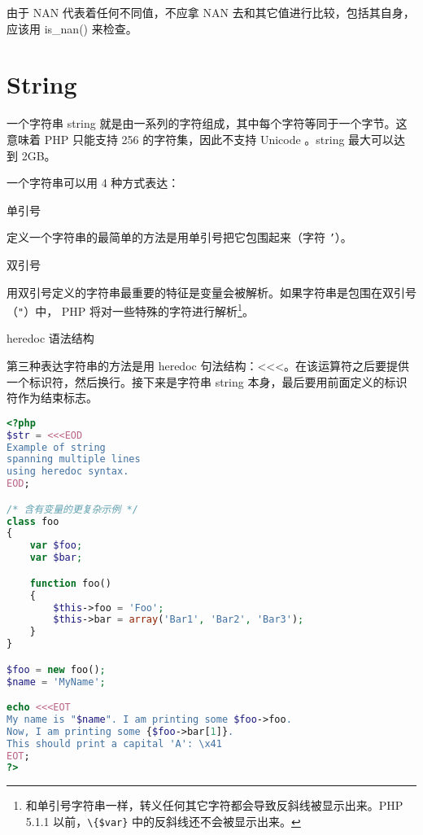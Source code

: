 由于 NAN 代表着任何不同值，不应拿 NAN 去和其它值进行比较，包括其自身，应该用 is\_nan() 来检查。




\section{String}

一个字符串 string 就是由一系列的字符组成，其中每个字符等同于一个字节。这意味着 PHP 只能支持 256 的字符集，因此不支持 Unicode 。string 最大可以达到 2GB。



一个字符串可以用 4 种方式表达：

\begin{compactitem}
\item 单引号

定义一个字符串的最简单的方法是用单引号把它包围起来（字符 \texttt{'}）。


\item 双引号

用双引号定义的字符串最重要的特征是变量会被解析。如果字符串是包围在双引号（\texttt{"}）中， PHP 将对一些特殊的字符进行解析\footnote{和单引号字符串一样，转义任何其它字符都会导致反斜线被显示出来。PHP 5.1.1 以前，\texttt{\textbackslash\{\$var\}} 中的反斜线还不会被显示出来。}。








\item heredoc 语法结构

第三种表达字符串的方法是用 heredoc 句法结构：<\/<\/<。在该运算符之后要提供一个标识符，然后换行。接下来是字符串 string 本身，最后要用前面定义的标识符作为结束标志。

\begin{lstlisting}[language=PHP]
<?php
$str = <<<EOD
Example of string
spanning multiple lines
using heredoc syntax.
EOD;

/* 含有变量的更复杂示例 */
class foo
{
    var $foo;
    var $bar;

    function foo()
    {
        $this->foo = 'Foo';
        $this->bar = array('Bar1', 'Bar2', 'Bar3');
    }
}

$foo = new foo();
$name = 'MyName';

echo <<<EOT
My name is "$name". I am printing some $foo->foo.
Now, I am printing some {$foo->bar[1]}.
This should print a capital 'A': \x41
EOT;
?>
\end{lstlisting}


\end{compactitem}
